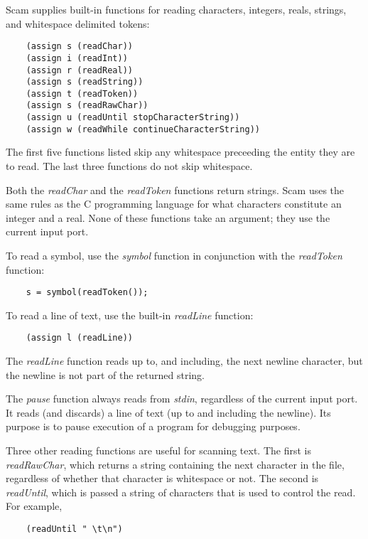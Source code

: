 Scam supplies built-in functions for reading characters,
integers, reals,
strings, and whitespace delimited tokens:

\begin{verbatim}
    (assign s (readChar))
    (assign i (readInt))
    (assign r (readReal))
    (assign s (readString))
    (assign t (readToken))
    (assign s (readRawChar))
    (assign u (readUntil stopCharacterString))
    (assign w (readWhile continueCharacterString))
\end{verbatim}

The first five functions listed skip any whitespace preceeding the
entity they are to read. The last three functions do not skip whitespace.

Both the {\it readChar} and the {\it readToken} functions return strings.
Scam uses the same rules as the C programming language
for what characters constitute an integer and a real.
None of these functions take an argument; they use the current
input port.

To read a symbol, use the {\it symbol} function in conjunction
with the {\it readToken} function:

\begin{verbatim}
    s = symbol(readToken());
\end{verbatim}

To read a line of text, use the built-in {\it readLine} function:

\begin{verbatim}
    (assign l (readLine))
\end{verbatim}

The {\it readLine} function reads up to, and including, the next
newline character, but the newline is not part of the
returned string.

The {\it pause} function always reads from {\it stdin},
regardless of the current input port.
It reads (and discards) a line of text (up to and including the newline).
Its purpose is to pause execution of a program for debugging
purposes.

Three other reading functions are useful for scanning text.
The first is {\it readRawChar}, which returns a string containing
the next character in the file, regardless of whether that
character is whitespace or not.
The second is {\it readUntil}, which is passed a string of characters
that is used to control the read. For example,

\begin{verbatim}
    (readUntil " \t\n")
\end{verbatim}

